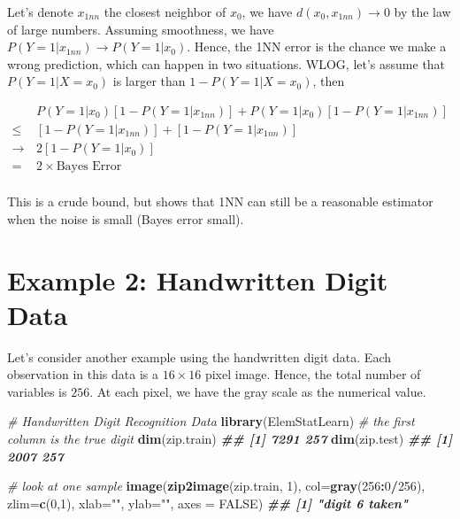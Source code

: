 \documentclass[
]{book}
\newenvironment{Shaded}{\begin{snugshade}}{\end{snugshade}}
\newcommand{\AttributeTok}[1]{\textcolor[rgb]{0.13,0.29,0.53}{#1}}
\newcommand{\CommentTok}[1]{\textcolor[rgb]{0.56,0.35,0.01}{\textit{#1}}}
\newcommand{\ConstantTok}[1]{\textcolor[rgb]{0.56,0.35,0.01}{#1}}
\newcommand{\DecValTok}[1]{\textcolor[rgb]{0.00,0.00,0.81}{#1}}
\newcommand{\DocumentationTok}[1]{\textcolor[rgb]{0.56,0.35,0.01}{\textbf{\textit{#1}}}}
\newcommand{\FunctionTok}[1]{\textcolor[rgb]{0.13,0.29,0.53}{\textbf{#1}}}
\newcommand{\NormalTok}[1]{#1}
\newcommand{\SpecialCharTok}[1]{\textcolor[rgb]{0.81,0.36,0.00}{\textbf{#1}}}
\newcommand{\StringTok}[1]{\textcolor[rgb]{0.31,0.60,0.02}{#1}}
\theoremstyle{definition}
\theoremstyle{definition}
\theoremstyle{definition}
\theoremstyle{definition}
\theoremstyle{remark}
\begin{document}
Let's denote \(x_{1nn}\) the closest neighbor of \(x_0\), we have \(d(x_0, x_{1nn}) \rightarrow 0\) by the law of large numbers. Assuming smoothness, we have \(P(Y = 1 | x_{1nn}) \rightarrow P(Y = 1 | x_0)\). Hence, the 1NN error is the chance we make a wrong prediction, which can happen in two situations. WLOG, let's assume that \(P(Y = 1 | X = x_0)\) is larger than \(1-P(Y = 1 | X = x_0)\), then

\begin{align}
& \,P(Y=1|x_0)[ 1 - P(Y=1|x_{1nn})] + P(Y=1|x_0)[ 1 - P(Y=1|x_{1nn})]\\
\leq & \,[ 1 - P(Y=1|x_{1nn})] + [ 1 - P(Y=1|x_{1nn})]\\
\rightarrow & \, 2[ 1 - P(Y=1|x_0)]\\
= & \,2 \times \text{Bayes Error}\\
\end{align}

This is a crude bound, but shows that 1NN can still be a reasonable estimator when the noise is small (Bayes error small).

\hypertarget{example-2-handwritten-digit-data}{%
\section{Example 2: Handwritten Digit Data}\label{example-2-handwritten-digit-data}}

Let's consider another example using the handwritten digit data. Each observation in this data is a \(16 \times 16\) pixel image. Hence, the total number of variables is \(256\). At each pixel, we have the gray scale as the numerical value.

\begin{Shaded}
\begin{Highlighting}[]
  \CommentTok{\# Handwritten Digit Recognition Data}
  \FunctionTok{library}\NormalTok{(ElemStatLearn)}
  \CommentTok{\# the first column is the true digit}
  \FunctionTok{dim}\NormalTok{(zip.train)}
\DocumentationTok{\#\# [1] 7291  257}
  \FunctionTok{dim}\NormalTok{(zip.test)}
\DocumentationTok{\#\# [1] 2007  257}
  
  \CommentTok{\# look at one sample}
  \FunctionTok{image}\NormalTok{(}\FunctionTok{zip2image}\NormalTok{(zip.train, }\DecValTok{1}\NormalTok{), }\AttributeTok{col=}\FunctionTok{gray}\NormalTok{(}\DecValTok{256}\SpecialCharTok{:}\DecValTok{0}\SpecialCharTok{/}\DecValTok{256}\NormalTok{), }\AttributeTok{zlim=}\FunctionTok{c}\NormalTok{(}\DecValTok{0}\NormalTok{,}\DecValTok{1}\NormalTok{), }
        \AttributeTok{xlab=}\StringTok{""}\NormalTok{, }\AttributeTok{ylab=}\StringTok{""}\NormalTok{, }\AttributeTok{axes =} \ConstantTok{FALSE}\NormalTok{)}
\DocumentationTok{\#\# [1] "digit  6  taken"}
\end{Highlighting}
\end{Shaded}
\end{document}
